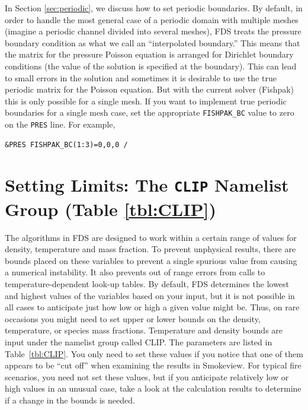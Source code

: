 \documentclass[11pt]{book}
\begin{document}
In Section \ref{sec:periodic}, we discuss how to set periodic boundaries.  By default, in order to handle the most general case of a periodic domain with multiple meshes (imagine a periodic channel divided into several meshes), FDS treats the pressure boundary condition as what we call an ``interpolated boundary.''  This means that the matrix for the pressure Poisson equation is arranged for Dirichlet boundary conditions (the value of the solution is specified at the boundary).  This can lead to small errors in the solution and sometimes it is desirable to use the true periodic matrix for the Poisson equation.  But with the current solver (Fishpak) this is only possible for a single mesh.  If you want to implement true periodic boundaries for a single mesh case, set the appropriate \verb=FISHPAK_BC= value to zero on the \verb=PRES= line.  For example,

\begin{lstlisting}
&PRES FISHPAK_BC(1:3)=0,0,0 /
\end{lstlisting}


\clearpage

\section{Setting Limits: The \texorpdfstring{{\tt CLIP}}{CLIP} Namelist Group (Table \ref{tbl:CLIP})}
\label{info:CLIP}

The algorithms in FDS are designed to work within a certain range of values for density, temperature and mass fraction. To prevent unphysical results,
there are bounds placed on these variables to prevent a single spurious value from causing a numerical instability. It also prevents out of range
errors from calls to temperature-dependent look-up tables. By default, FDS determines the lowest and highest values of the variables based on your input, but it is not
possible in all cases to anticipate just how low or high a given value might be. Thus,
on rare occasions you might need to set upper or lower bounds on the density, temperature, or species mass fractions. Temperature and density bounds are input under the
namelist group called {\ct CLIP}. The parameters are listed in Table~\ref{tbl:CLIP}. You only need to set these values if you notice that one of them appears to be
``cut off'' when examining the results in Smokeview. For typical fire scenarios, you need not set these values, but if you anticipate relatively low or high values in an
unusual case, take a look at the calculation results to determine if a change in the bounds is needed.
\end{document}
